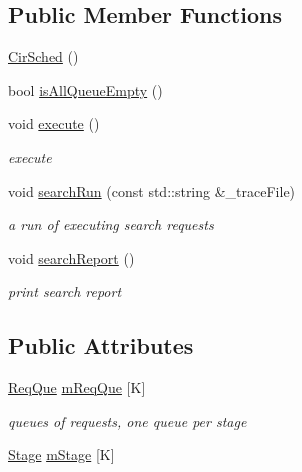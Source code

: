 \subsection*{Public Member Functions}
\begin{DoxyCompactItemize}
\item 
\hyperlink{classCirSched_a17c4878659ef9924496b2e773ef997eb}{Cir\-Sched} ()
\item 
bool \hyperlink{classCirSched_aaa57ac8164b5e76d660d703abdfe2e34}{is\-All\-Queue\-Empty} ()
\item 
void \hyperlink{classCirSched_a9ba8ae5c2414284e98eebd8e520b14ae}{execute} ()
\begin{DoxyCompactList}\small\item\em execute \end{DoxyCompactList}\item 
void \hyperlink{classCirSched_aedcd80a449e68ab8a1f11280175aa319}{search\-Run} (const std\-::string \&\-\_\-trace\-File)
\begin{DoxyCompactList}\small\item\em a run of executing search requests \end{DoxyCompactList}\item 
void \hyperlink{classCirSched_aff159ce78575a0b97430c42738cdf79c}{search\-Report} ()
\begin{DoxyCompactList}\small\item\em print search report \end{DoxyCompactList}\end{DoxyCompactItemize}
\subsection*{Public Attributes}
\begin{DoxyCompactItemize}
\item 
\hyperlink{structCirSched_1_1ReqQue}{Req\-Que} \hyperlink{classCirSched_a626135d70cbd18b7031a7eed0aafabd5}{m\-Req\-Que} \mbox{[}K\mbox{]}
\begin{DoxyCompactList}\small\item\em queues of requests, one queue per stage \end{DoxyCompactList}\item 
\hyperlink{structCirSched_1_1Stage}{Stage} \hyperlink{classCirSched_a8fecfc9c0deb2e6dca0254f8451b3ab6}{m\-Stage} \mbox{[}K\mbox{]}
\end{DoxyCompactItemize}

